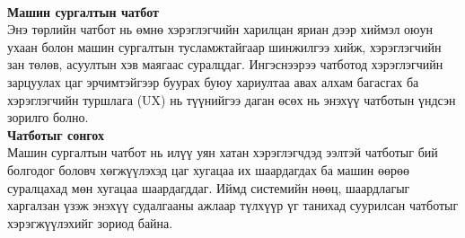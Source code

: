 \\
\textbf{Машин сургалтын чатбот}
\\Энэ төрлийн чатбот нь өмнө хэрэглэгчийн харилцан яриан дээр хиймэл оюун ухаан болон машин сургалтын тусламжтайгаар шинжилгээ хийж, хэрэглэгчийн зан төлөв, асуултын хэв маягаас суралцдаг. Ингэснээрээ чатботод хэрэглэгчийн зарцуулах цаг эрчимтэйгээр буурах буюу хариултаа авах алхам багасгах ба хэрэглэгчийн туршлага (UX) нь түүнийгээ даган өсөх нь энэхүү чатботын үндсэн зорилго болно. 
\\
\textbf{Чатботыг сонгох}
\\Машин сургалтын чатбот нь илүү уян хатан хэрэглэгчдэд ээлтэй чатботыг бий болгодог боловч хөгжүүлэхэд цаг хугацаа их шаардагдах ба машин өөрөө суралцахад мөн хугацаа шаардагддаг. Иймд системийн нөөц, шаардлагыг харгалзан үзэж энэхүү судалгааны ажлаар түлхүүр үг танихад суурилсан чатботыг хэрэгжүүлэхийг зориод байна. 
